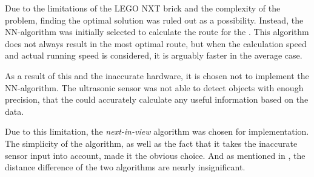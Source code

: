 Due to the limitations of the LEGO NXT brick and the complexity of the problem, finding the optimal solution was ruled out as a possibility. Instead, the NN-algorithm was initially selected to calculate the route for the \projname{}. This algorithm does not always result in the most optimal route, but when the calculation speed and actual running speed is considered, it is arguably faster in the average case. 

As a result of this and the inaccurate hardware, it is chosen not to implement the NN-algorithm. The ultrasonic sensor was not able to detect objects with enough precision, that the \projname{} could accurately calculate any useful information based on the data.

Due to this limitation, the \emph{next-in-view} algorithm was chosen for implementation. The simplicity of the algorithm, as well as the fact that it takes the inaccurate sensor input into account, made it the obvious choice. And as mentioned in , the distance difference of the two algorithms are nearly insignificant.
